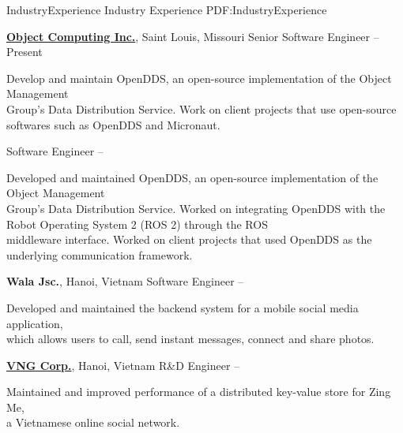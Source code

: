 \documentclass[letterpaper,MMMyyyy,nonstopmode]{simpleresumecv}
\begin{document}
\begin{Body}


\Section
{Industry\newline Experience}
{Industry Experience}
{PDF:IndustryExperience}

\Entry
\href{https://objectcomputing.com/}
{\textbf{Object Computing Inc.}}, Saint Louis, Missouri
\Gap
\BulletItem
Senior Software Engineer
\hfill
{} -- Present
\begin{Detail}
\SubBulletItem
Develop and maintain OpenDDS, an open-source implementation of the Object Management \\
Group's Data Distribution Service.
\SubBulletItem
Work on client projects that use open-source softwares such as OpenDDS and Micronaut.
\end{Detail}
\Gap
\BulletItem
Software Engineer
\hfill
{} -- 
\begin{Detail}
\SubBulletItem
Developed and maintained OpenDDS, an open-source implementation of the Object Management \\
Group's Data Distribution Service.
\SubBulletItem
Worked on integrating OpenDDS with the Robot Operating System 2 (ROS 2) through the ROS \\
middleware interface.
\SubBulletItem
Worked on client projects that used OpenDDS as the underlying communication framework.
\end{Detail}
\BigGap

\Entry
{\textbf{Wala Jsc.}}, Hanoi, Vietnam
\Gap
\BulletItem
Software Engineer
\hfill
{} -- 
\begin{Detail}
\SubBulletItem
Developed and maintained the backend system for a mobile social media application, \\
which allows users to call, send instant messages, connect and share photos.
\end{Detail}

\BigGap
\Entry
\href{https://www.vng.com.vn/en/index.html}
{\textbf{VNG Corp.}}, Hanoi, Vietnam
\Gap
\BulletItem
R\&D Engineer
\hfill
{} -- 
\begin{Detail}
\SubBulletItem
Maintained and improved performance of a distributed key-value store for Zing Me, \\
a Vietnamese online social network.
\end{Detail}


\end{Body}
\end{document}
